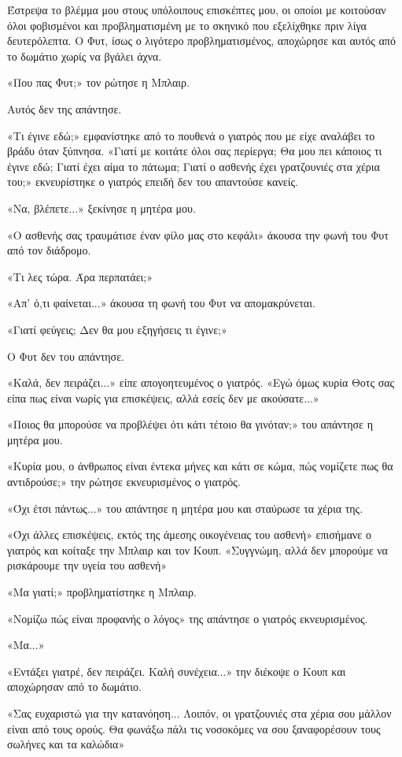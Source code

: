 \documentclass[12pt,twoside, openany]{book}
\begin{document}
Έστρεψα το βλέμμα μου στους υπόλοιπους επισκέπτες μου, οι οποίοι με κοιτούσαν όλοι φοβισμένοι και προβληματισμένη με το σκηνικό που εξελίχθηκε πριν λίγα δευτερόλεπτα. Ο Φυτ, ίσως ο λιγότερο προβληματισμένος, αποχώρησε και αυτός από το δωμάτιο χωρίς να βγάλει άχνα.

«Που πας Φυτ;» τον ρώτησε η Μπλαιρ.

Αυτός δεν της απάντησε.

«Τι έγινε εδώ;» εμφανίστηκε από το πουθενά ο γιατρός που με είχε αναλάβει το βράδυ όταν ξύπνησα. «Γιατί με κοιτάτε όλοι σας περίεργα; Θα μου πει κάποιος τι έγινε εδώ; Γιατί έχει αίμα το πάτωμα; Γιατί ο ασθενής έχει γρατζουνιές στα χέρια του;» εκνευρίστηκε ο γιατρός επειδή δεν του απαντούσε κανείς.

«Να, βλέπετε...» ξεκίνησε η μητέρα μου.

«Ο ασθενής σας τραυμάτισε έναν φίλο μας στο κεφάλι» άκουσα την φωνή του Φυτ από τον διάδρομο.

«Τι λες τώρα. Άρα περπατάει;»

«Απ’ ό,τι φαίνεται...» άκουσα τη φωνή του Φυτ να απομακρύνεται.

«Γιατί φεύγεις; Δεν θα μου εξηγήσεις τι έγινε;»

Ο Φυτ δεν του απάντησε.

«Καλά, δεν πειράζει...» είπε απογοητευμένος ο γιατρός. «Εγώ όμως κυρία Θοτς σας είπα πως είναι νωρίς για επισκέψεις, αλλά εσείς δεν με ακούσατε...»

«Ποιος θα μπορούσε να προβλέψει ότι κάτι τέτοιο θα γινόταν;» του απάντησε η μητέρα μου.

«Κυρία μου, ο άνθρωπος είναι έντεκα μήνες και κάτι σε κώμα, πώς νομίζετε πως θα αντιδρούσε;» την ρώτησε εκνευρισμένος ο γιατρός.

«Όχι έτσι πάντως...» του απάντησε η μητέρα μου και σταύρωσε τα χέρια της.

«Όχι άλλες επισκέψεις, εκτός της άμεσης οικογένειας του ασθενή» επισήμανε ο γιατρός και κοίταξε την Μπλαιρ και τον Κουπ. «Συγγνώμη, αλλά δεν μπορούμε να ρισκάρουμε την υγεία του ασθενή»

«Μα γιατί;» προβληματίστηκε η Μπλαιρ.

«Νομίζω πώς είναι προφανής ο λόγος» της απάντησε ο γιατρός εκνευρισμένος.

«Μα...»

«Εντάξει γιατρέ, δεν πειράζει. Καλή συνέχεια...» την διέκοψε ο Κουπ και αποχώρησαν από το δωμάτιο.

«Σας ευχαριστώ για την κατανόηση... Λοιπόν, οι γρατζουνιές στα χέρια σου μάλλον είναι από τους ορούς. Θα φωνάξω πάλι τις νοσοκόμες να σου ξαναφορέσουν τους σωλήνες και τα καλώδια»
\end{document}
